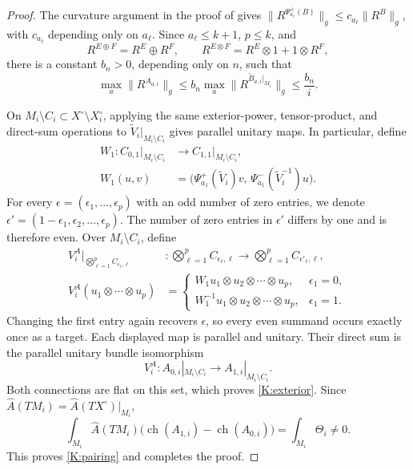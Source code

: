 \documentclass[12pt,reqno]{amsart}
\numberwithin{equation}{section}
\theoremstyle{definition}
\newcommand{\Ahat}{\widehat A}
\newcommand{\ch}{\operatorname{ch}}
\begin{document}
\begin{proof}
The curvature argument in the proof of
\cite[Lemma~5, equation~(4)]{BaerHankeKCowaist} gives
$\|R^{\Psi_{a_\ell}^\pm(B)}\|_g\leq c_{a_\ell}\|R^B\|_g$,
with $c_{a_\ell}$ depending only on $a_\ell$.  Since
$a_\ell\leq k+1$, $p\leq k$, and
\[
 R^{E\oplus F}=R^E\oplus R^F,\qquad
 R^{E\otimes F}=R^E\otimes1+1\otimes R^F,
\]
there is a constant $b_n>0$, depending only on $n$, such that
\[
 \max_a\|R^{A_{a,i}}\|_g
 \leq b_n\max_a\|R^{\widetilde B_{a,i}|_{M_i}}\|_g
 \leq\frac{b_n}{i}.
\]

On $M_i\setminus C_i\subset X^\circ\setminus X_i^\circ$,
applying the same exterior-power, tensor-product, and direct-sum
operations to $\widetilde V_i|_{M_i\setminus C_i}$ gives parallel
unitary maps.  In particular, define
\[
\begin{aligned}
 W_1:C_{0,1}|_{M_i\setminus C_i}
   &\longrightarrow C_{1,1}|_{M_i\setminus C_i},\\
 W_1(u,v)&=
 \bigl(\Psi_{a_1}^+(\widetilde V_i)v,\,
       \Psi_{a_1}^-(\widetilde V_i^{-1})u\bigr).
\end{aligned}
\]
For every $\epsilon=(\epsilon_1,\ldots,\epsilon_p)$ with an odd number of zero entries, we denote
$\epsilon'=(1-\epsilon_1,\epsilon_2,\ldots,\epsilon_p)$.
The number of zero entries in $\epsilon'$ differs by one and is
therefore even.  Over $M_i\setminus C_i$, define
\[
\begin{aligned}
 V_i^A\big|_{\bigotimes_{\ell=1}^pC_{\epsilon_\ell,\ell}}
 &: \bigotimes_{\ell=1}^pC_{\epsilon_\ell,\ell}
 \longrightarrow
 \bigotimes_{\ell=1}^pC_{\epsilon'_\ell,\ell},\\
 V_i^A(u_1\otimes\cdots\otimes u_p)
 &=\begin{cases}
  W_1u_1\otimes u_2\otimes\cdots\otimes u_p,
       &\epsilon_1=0,\\
  W_1^{-1}u_1\otimes u_2\otimes\cdots\otimes u_p,
       &\epsilon_1=1.
 \end{cases}
\end{aligned}
\]
Changing the first entry again recovers $\epsilon$, so every even
summand occurs exactly once as a target.  Each displayed map is
parallel and unitary. Their direct sum is the parallel unitary bundle
isomorphism
\[
 V_i^A:A_{0,i}|_{M_i\setminus C_i}
       \longrightarrow A_{1,i}|_{M_i\setminus C_i}.
\]
Both connections are flat on this set, which proves \ref{K:exterior}.
Since $\Ahat(TM_i)=\Ahat(TX^\circ)|_{M_i}$,
\[
 \int_{M_i}\Ahat(TM_i)
 \bigl(\ch(A_{1,i})-\ch(A_{0,i})\bigr)
 =\int_{M_i}\Theta_i\ne0.
\]
This proves \ref{K:pairing} and completes the proof.
\end{proof}
\end{document}
